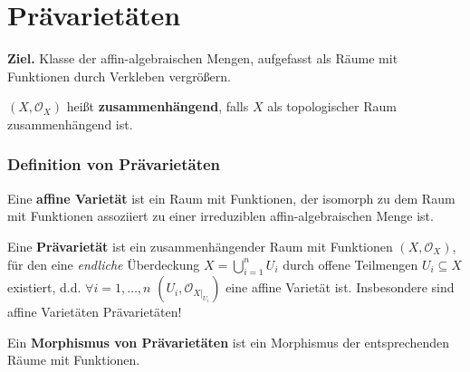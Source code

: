
\part*{Prävarietäten}

\textbf{Ziel.} Klasse der affin-algebraischen Mengen, aufgefasst
als Räume mit Funktionen durch Verkleben vergrößern.

$(X,\mathcal{O}_{X})$ heißt \textbf{zusammenhängend}, falls $X$
als topologischer Raum zusammenhängend ist.

\section{Definition von Prävarietäten}
\label{sec:def-praevarietaet}
\begin{defn}[orig. 37]
  \label{def:affine-varietaet}
  Eine \textbf{affine Varietät} ist ein Raum
  mit Funktionen, der isomorph zu dem Raum mit Funktionen assoziiert zu einer irreduziblen affin-algebraischen Menge ist.
\end{defn}
% 
\begin{defn}[orig. 38]
  \label{def:praevarietaet}
  Eine \textbf{Prävarietät} ist ein zusammenhängender Raum mit Funktionen
  $(X,\mathcal{O}_{X})$, für den eine \emph{endliche }Überdeckung $X=\bigcup_{i=1}^{n}U_{i}$ durch offene Teilmengen $U_i \subseteq X$
  existiert, d.d. $\forall i=1,\ldots,n$ $(U_{i},\mathcal{O}_{X|_{U_{i}}})$
  eine affine Varietät ist.  Insbesondere sind affine Varietäten Prävarietäten!

  Ein \textbf{Morphismus von Prävarietäten} ist ein Morphismus der entsprechenden Räume mit Funktionen.
\end{defn}

